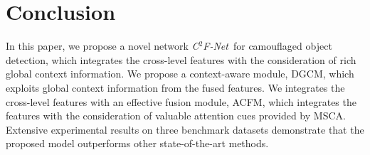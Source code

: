\documentclass{article}
\def\OurModel{\textit{C$^2$F-Net}} %
\begin{document}
\section{Conclusion}
In this paper, we propose a novel network \OurModel~for camouflaged object detection, which integrates the cross-level features with the consideration of rich global context information. We propose a context-aware module, DGCM, which exploits global context information from the fused features. We integrates the cross-level features with an effective fusion module, ACFM, which integrates the features with the consideration of valuable attention cues provided by MSCA. Extensive experimental results on three benchmark datasets demonstrate that the proposed model outperforms other state-of-the-art methods. 





{


}
\end{document}
